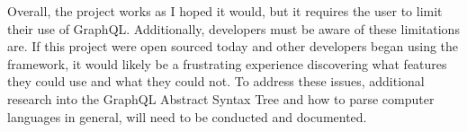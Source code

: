 Overall, the project works as I hoped it would, but it requires the user to limit their use of GraphQL.  Additionally, developers must be aware of these limitations are.  If this project were open sourced today and other developers began using the framework, it would likely be a frustrating experience discovering what features they could use and what they could not.  To address these issues, additional research into the GraphQL Abstract Syntax Tree and how to parse computer languages in general, will need to be conducted and documented.